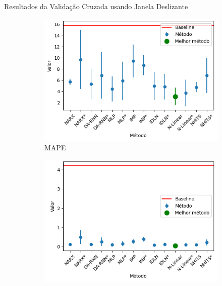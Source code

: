 \begin{table}[ht]
	\centering
	\caption{Resultados da Validação Cruzada usando Janela Deslizante}
	\label{tab:resultados_validacao}
	\begin{adjustbox}{angle=90, scale=0.63}
		
	\end{adjustbox}
\end{table}
\begin{figure}[htbp]
	\centering
	\begin{subfigure}[b]{0.3\textwidth}
		\centering
		\includegraphics[width=\textwidth]{figuras/mape_brasil_results.png}
		\caption{\ac{MAPE}}
		\label{fig:mape_brasil_results}
	\end{subfigure}
	\hfill
	\begin{subfigure}[b]{0.3\textwidth}
		\centering
		\includegraphics[width=\textwidth]{figuras/sle_brasil_results.png}

\end{subfigure}
\end{figure}
